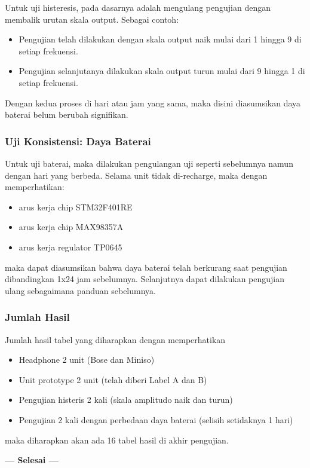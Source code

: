 \documentclass[12pt,]{article}
\begin{document}
	Untuk uji histeresis, pada dasarnya adalah mengulang pengujian dengan membalik urutan skala output.
	Sebagai contoh:
	\begin{itemize}
		\item Pengujian telah dilakukan dengan skala output naik mulai dari 1 hingga 9 di setiap frekuensi.
		\item Pengujian selanjutanya dilakukan skala output turun mulai dari 9 hingga 1 di setiap frekuensi.
	\end{itemize}
	
	Dengan kedua proses di hari atau jam yang sama, maka disini diasumsikan daya baterai belum berubah signifikan.
	
	\subsubsection{Uji Konsistensi: Daya Baterai}
	
	Untuk uji baterai, maka dilakukan pengulangan uji seperti sebelumnya namun dengan hari yang berbeda.
	Selama unit tidak di-recharge, maka dengan memperhatikan:
	\begin{itemize}
		\item arus kerja chip STM32F401RE
		\item arus kerja chip MAX98357A
		\item arus kerja regulator TP0645
	\end{itemize}
	maka dapat diasumsikan bahwa daya baterai telah berkurang saat pengujian dibandingkan 1x24 jam sebelumnya.
	Selanjutnya dapat dilakukan pengujian ulang sebagaimana panduan sebelumnya.
	
	\subsubsection{Jumlah Hasil}
	Jumlah hasil tabel yang diharapkan dengan memperhatikan
	\begin{itemize}
		\item Headphone 2 unit (Bose dan Miniso)
		\item Unit prototype 2 unit (telah diberi Label A dan B)
		\item Pengujian histeris 2 kali (skala amplitudo naik dan turun)
		\item Pengujian 2 kali dengan perbedaan daya baterai (selisih setidaknya 1 hari)
	\end{itemize}
	
	maka diharapkan akan ada 16 tabel hasil di akhir pengujian.
	
	\vspace{30pt}\centering \textbf{--- Selesai ---}
	
	
\end{document}

